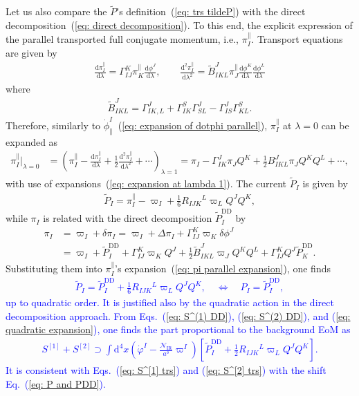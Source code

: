\documentclass[aps, prd
, preprint
, nofootinbib 
, longbibliography
]{revtex4-1}
\newcommand{\dif}[2]{\frac{\mathrm{d} #1}{\mathrm{d} #2}}
\newcommand{\dd}{\mathrm{d}}
\newcommand{\IR}{\mathrm{IR}}
\newcommand{\dps}{\displaystyle}
\newcommand{\calN}{\mathcal{N}}
\newcommand{\bae}[1]{\begin{align} #1 \end{align}}
\newcommand{\bce}[1]{\begin{cases} #1 \end{cases}}
\newcommand{\Blue}[1]{\textcolor{blue}{\sffamily #1}}
\begin{document}
Let us also compare the $\tilde{P}$'s definition~(\ref{eq: trs tildeP}) with the direct decomposition~(\ref{eq: direct decomposition}).
To this end, the explicit expression of the parallel transported full conjugate momentum, i.e., $\pi_I^\parallel$.
Transport equations are given by
\bae{
    \dif{\pi_I^\parallel}{\lambda}=\Gamma_{IJ}^K\pi_K^\parallel\dif{\phi^J}{\lambda}, \qquad \dif{^2\pi_I^\parallel}{\lambda^2}=\tilde{B}^J_{IKL}\pi_J^\parallel\dif{\phi^K}{\lambda}\dif{\phi^L}{\lambda}%
}
where
\bae{
        \tilde{B}^J_{IKL}=\Gamma^J_{IK,L}+\Gamma^S_{IK}\Gamma^J_{SL}-\Gamma^J_{IS}\Gamma^S_{KL}.%
}
Therefore, similarly to $\dot{\phi}^I_\parallel$~(\ref{eq: expansion of dotphi parallel}), $\pi_I^\parallel$ at $\lambda=0$ can be expanded as
\bae{\label{eq: pi parallel expansion}
    \pi_I^\parallel|_{\lambda=0}&=\left(\pi_I^\parallel-\dif{\pi_I^\parallel}{\lambda}+\frac{1}{2}\dif{^2\pi_I^\parallel}{\lambda^2}%
    +\cdots\right)_{\lambda=1}=\pi_I-\Gamma^J_{IK}\pi_JQ^K+\frac{1}{2}B^J_{IKL}\pi_JQ^KQ^L+\cdots,
}
with use of expansions~(\ref{eq: expansion at lambda 1}).
The current $\tilde{P}_I$ is given by
\bae{
    \tilde{P}_I=\pi_I^\parallel-\varpi_I+\frac{1}{6}R_{IJK}{}^L\varpi_LQ^JQ^K,
}
while $\pi_I$ is related with the direct decomposition $\tilde{P}_I^\mathrm{DD}$ by
\bae{
    \pi_I&=\varpi_I+\delta\pi_I=\varpi_I+\Delta\pi_I+\Gamma^K_{IJ}\varpi_K\delta\phi^J \nonumber \\
    &=\varpi_I+\tilde{P}_I^\mathrm{DD}+\Gamma^K_{IJ}\varpi_KQ^J+\frac{1}{2}\tilde{B}^J_{IKL}\varpi_JQ^KQ^L+\Gamma^K_{IJ}Q^J\tilde{P}_K^\mathrm{DD}.
}
Substituting them into $\pi_I^\parallel$'s expansion~(\ref{eq: pi parallel expansion}), one finds
\Blue{
\bae{\label{eq: P and PDD}
    \tilde{P}_I=\tilde{P}_I^\mathrm{DD}+\frac{1}{6}R_{IJK}{}^L\varpi_LQ^JQ^K, \quad \Leftrightarrow \quad P_I=\tilde{P}_I^\mathrm{DD},
}
up to quadratic order.
It is justified also by the quadratic action in the direct decomposition approach.
From Eqs.~(\ref{eq: S^(1) DD}), (\ref{eq: S^(2) DD}), and (\ref{eq: quadratic expansion}), one finds the part proportional to the background EoM as
\bae{
    S^{[1]}+S^{[2]}\supset\int\dd^4x\left(\dot{\varphi}^I-\frac{\calN_\IR}{a^3}\varpi^I\right)\left[\tilde{P}_I^\mathrm{DD}+\frac{1}{2}R_{IJK}{}^L\varpi_LQ^JQ^K\right].
}
It is consistent with Eqs.~(\ref{eq: S^[1] trs}) and (\ref{eq: S^[2] trs}) with the shift Eq.~(\ref{eq: P and PDD}).
}
\end{document}
